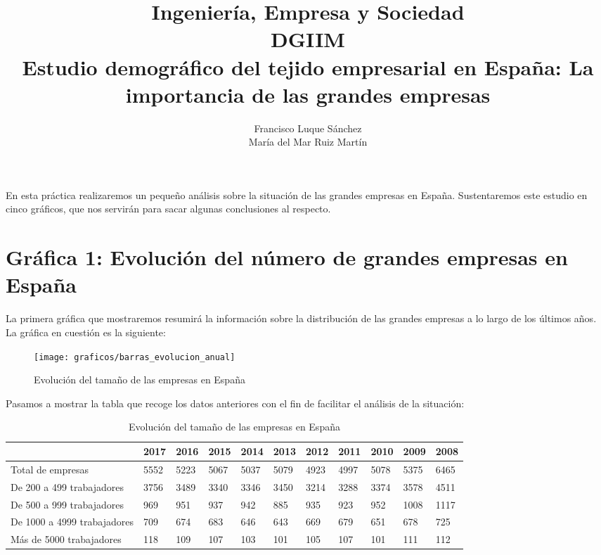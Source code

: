 \documentclass[11pt]{article}
\theoremstyle{plain}
\theoremstyle{definition}
\begin{document}
\title{Ingeniería, Empresa y Sociedad \\
  DGIIM \\
  \large Estudio demográfico del tejido empresarial en España: La
  importancia de las grandes empresas}
\author{Francisco Luque Sánchez\\
  María del Mar Ruiz Martín}
\maketitle

En esta práctica realizaremos un pequeño análisis sobre la situación
de las grandes empresas en España. Sustentaremos este estudio en cinco
gráficos, que nos servirán para sacar algunas conclusiones al respecto.

\section{Gráfica 1: Evolución del número de grandes empresas en
  España}

La primera gráfica que mostraremos resumirá la información sobre la
distribución de las grandes empresas a lo largo de los últimos años.
La gráfica en cuestión es la siguiente:

\begin{figure}[H]
  \centering
  \texttt{[image: graficos/barras\_evolucion\_anual]}
  \caption{Evolución del tamaño de las empresas en España}
\end{figure}


Pasamos a mostrar la tabla que recoge los datos anteriores con el fin
de facilitar el análisis de la situación:

\begin{table}[H]
\centering
\begin{tabular}{|l|l|l|l|l|l|l|l|l|l|l|}
\hline
  & 2017  & 2016  & 2015  & 2014  & 2013  & 2012  & 2011  & 2010 &  2009 &  2008\\
\hline
Total de empresas & 5552  & 5223  & 5067  & 5037  & 5079  & 4923  & 4997  & 5078 &  5375 &  6465\\
De 200 a 499 trabajadores & 3756  & 3489  & 3340  & 3346  & 3450  & 3214  & 3288  & 3374 &  3578 &  4511\\
De 500 a 999 trabajadores & 969 & 951 & 937 & 942 & 885 & 935 & 923 & 952 & 1008 &  1117\\
De 1000 a 4999 trabajadores & 709 & 674 & 683 & 646 & 643 & 669 & 679 & 651 & 678 & 725\\
Más de 5000 trabajadores  & 118 & 109 & 107 & 103 & 101 & 105 & 107 & 101 & 111 & 112\\
\hline

\end{tabular}
\caption{Evolución del tamaño de las empresas en España}
\end{table}
\end{document}
